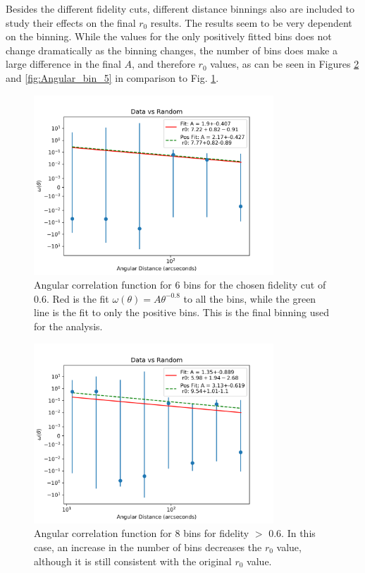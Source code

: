 Besides the different fidelity cuts, different distance binnings also are included to study their effects on the final $r_0$ results. The results seem to be very dependent on the binning. While the values for the only positively fitted bins does not change dramatically as the binning changes, the number of bins does make a large difference in the final $A$, and therefore $r_0$ values, as can be seen in Figures \ref{fig:Angular_bin_8} and \ref{fig:Angular_bin_5} in comparison to Fig. \ref{fig:Angular_binnings}.

\begin{figure}[!tbp]
\centering \includegraphics[width=90mm]{clustering_two/Data_vs_Random_10000_bin6_sn0_6_NFalse.png}
\caption{Angular correlation function for 6 bins for the chosen fidelity cut of 0.6. Red is the fit $\omega(\theta) = A\theta^{-0.8}$ to all the bins, while the green line is the fit to only the positive bins. This is the final binning used for the analysis. }
\label{fig:Angular_binnings}
\end{figure}

\begin{figure}[!tbp]
\centering \includegraphics[width=90mm]{clustering_two/Data_vs_Random_10000_bin8_sn0_6_NFalse.png}
\caption{Angular correlation function for 8 bins  for fidelity $>$ 0.6. In this case, an increase in the number of bins decreases the $r_0$ value, although it is still consistent with the original $r_0$ value.}
\label{fig:Angular_bin_8}
\end{figure}

